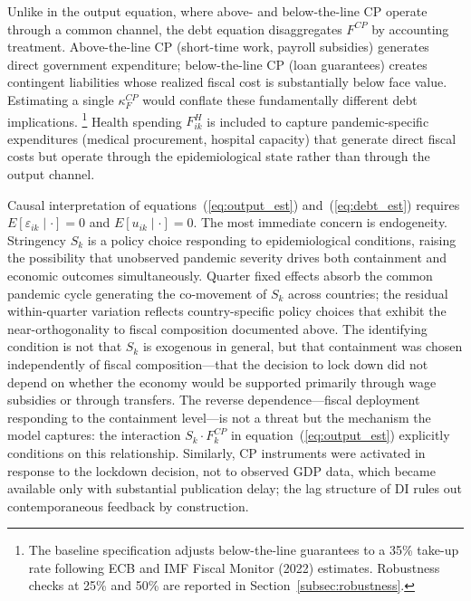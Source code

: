 \documentclass[12pt, a4paper]{article}
\begin{document}
Unlike in the output equation, where above- and below-the-line CP operate through a common channel, the debt equation disaggregates $F^{CP}$ by accounting treatment. Above-the-line CP (short-time work, payroll subsidies) generates direct government expenditure; below-the-line CP (loan guarantees)
creates contingent liabilities whose realized fiscal cost is substantially below face value. Estimating a single $\kappa_F^{CP}$ would conflate these
fundamentally different debt implications.%
\footnote{The baseline specification adjusts below-the-line guarantees to a 35\% take-up rate following ECB and IMF Fiscal Monitor (2022) estimates.
Robustness checks at 25\% and 50\% are reported in
Section~\ref{subsec:robustness}.} 
Health spending $F_{ik}^H$ is included to capture pandemic-specific expenditures (medical procurement, hospital capacity) that generate direct
fiscal costs but operate through the epidemiological state rather than through
the output channel.

\vspace{5mm}


Causal interpretation of equations~(\ref{eq:output_est}) and~(\ref{eq:debt_est}) requires $E[\varepsilon_{ik} \mid \cdot] = 0$ and $E[u_{ik} \mid \cdot] = 0$. The most immediate concern is endogeneity. Stringency $S_k$ is a policy choice responding to epidemiological conditions, raising the possibility that unobserved pandemic severity drives both containment and economic outcomes simultaneously. Quarter fixed effects absorb the common pandemic cycle generating the co-movement of $S_k$ across countries; the residual within-quarter variation reflects country-specific policy choices that exhibit the near-orthogonality to fiscal composition documented above. The identifying condition is not that $S_k$ is exogenous in general, but that containment was chosen independently of fiscal composition---that the decision to lock down did not depend on whether the economy would be supported primarily through wage subsidies or through transfers. The reverse dependence---fiscal deployment responding to the containment level---is not a threat but the mechanism the model captures: the interaction $S_k \cdot F_k^{CP}$ in equation~(\ref{eq:output_est}) explicitly conditions on this relationship. Similarly, CP instruments were activated in response to the lockdown decision, not to observed GDP data, which became available only with substantial publication delay; the lag structure of DI rules out contemporaneous feedback by construction. 
\end{document}
